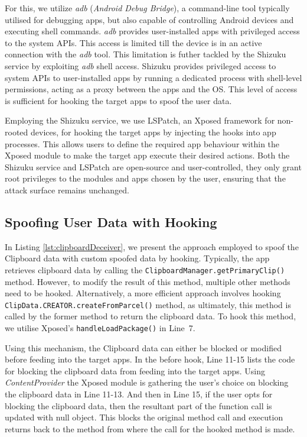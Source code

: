For this, we utilize \textit{adb} (\textit{Android Debug Bridge}), a command-line tool typically utilised for debugging apps, but also capable of controlling Android devices and executing shell commands. \textit{adb} provides user-installed apps with privileged access to the system APIs. This access is limited till the device is in an active connection with the \textit{adb} tool. This limitation is futher tackled by the Shizuku service by exploiting \textit{adb} shell access. Shizuku provides privileged access to system APIs to user-installed apps by running a dedicated process with shell-level permissions, acting as a proxy between the apps and the OS. This level of access is sufficient for hooking the target apps to spoof the user data. 

Employing the Shizuku service, we use LSPatch, an Xposed framework for non-rooted devices, for hooking the target apps by injecting the hooks into app processes. This allows users to define the required app behaviour within the Xposed module to make the target app execute their desired actions. Both the Shizuku service and LSPatch are open-source and user-controlled, they only grant root privileges to the modules and apps chosen by the user, ensuring that the attack surface remains unchanged.

\subsection{Spoofing User Data with Hooking}

In Listing \ref{lst:clipboardDeceiver}, we present the approach employed to spoof the Clipboard data with custom spoofed data by hooking. Typically, the app retrieves clipboard data by calling the \texttt{ClipboardManager.getPrimaryClip()} method. However, to modify the result of this method, multiple other methods need to be hooked. Alternatively, a more efficient approach involves hooking \texttt{ClipData.CREATOR.createFromParcel()} method, as ultimately, this method is called by the former method to return the clipboard data. To hook this method, we utilise Xposed's \texttt{handleLoadPackage()} in Line~7.

Using this mechanism, the Clipboard data can either be blocked or modified before feeding into the target apps. In the before hook, Line 11-15 lists the code for blocking the clipboard data from feeding into the target apps. Using \textit{ContentProvider} the Xposed module is gathering the user's choice on blocking the clipboard data in Line 11-13. And then in Line 15, if the user opts for blocking the clipboard data, then the resultant part of the function call is updated with null object. This blocks the original method call and execution returns back to the method from where the call for the hooked method is made. 

